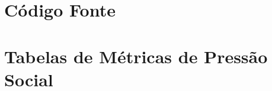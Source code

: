\documentclass[mestrado, pre-defesa]{packages/icmc}
\begin{document}
% 

\postextual





\glsaddall
\printglossaries


\begin{apendicesenv}
	\chapter{Código Fonte}
	\label{chapter:source_code}
	
	\chapter{Tabelas de Métricas de Pressão Social}
	\label{chapter:tables_social_pressure}
	
\end{apendicesenv}




%    

\end{document}
